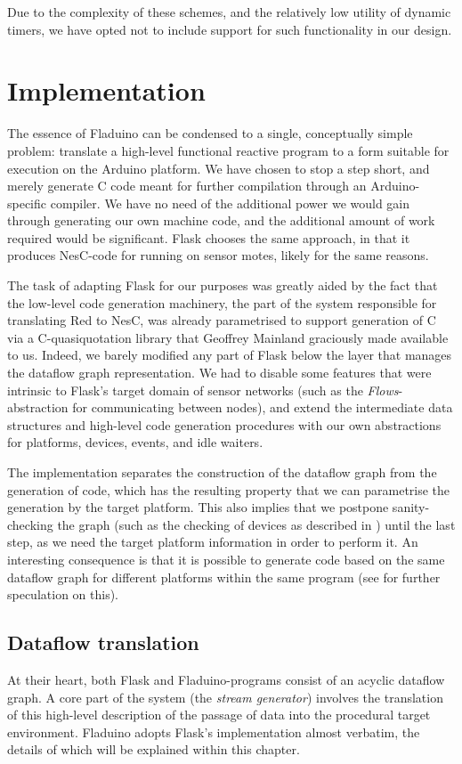 \documentclass[a4paper, oneside, final]{memoir}
\let\Fref\undefined
\begin{document}
Due to the complexity of these schemes, and the relatively low utility
of dynamic timers, we have opted not to include support for such
functionality in our design.

\chapter{Implementation}
\label{chap:implementation}

The essence of Fladuino can be condensed to a single, conceptually
simple problem: translate a high-level functional reactive program to
a form suitable for execution on the Arduino platform.  We have chosen
to stop a step short, and merely generate C code meant for further
compilation through an Arduino-specific compiler.  We have no need of
the additional power we would gain through generating our own machine
code, and the additional amount of work required would be significant.
Flask chooses the same approach, in that it produces NesC-code for
running on sensor motes, likely for the same reasons.

The task of adapting Flask for our purposes was greatly aided by the
fact that the low-level code generation machinery, the part of the
system responsible for translating Red to NesC, was already
parametrised to support generation of C via a C-quasiquotation library
that Geoffrey Mainland graciously made available to us.  Indeed, we
barely modified any part of Flask below the layer that manages the
dataflow graph representation.  We had to disable some features that
were intrinsic to Flask's target domain of sensor networks (such as
the \textit{Flows}-abstraction for communicating between nodes), and
extend the intermediate data structures and high-level code generation
procedures with our own abstractions for platforms, devices, events,
and idle waiters.

The implementation separates the construction of the dataflow graph
from the generation of code, which has the resulting property that we
can parametrise the generation by the target platform.  This also
implies that we postpone sanity-checking the graph (such as the
checking of devices as described in \Fref{sec:devices}) until the last
step, as we need the target platform information in order to perform
it.  An interesting consequence is that it is possible to generate
code based on the same dataflow graph for different platforms within
the same program (see \Fref{chap:futurework} for further speculation
on this).

\section{Dataflow translation}
\label{sec:dataflowtranslation}
At their heart, both Flask and Fladuino-programs consist of an
acyclic dataflow graph.  A core part of the system (the \textit{stream
  generator}) involves the translation of this high-level description
of the passage of data into the procedural target environment.
Fladuino adopts Flask's implementation almost verbatim, the details of
which will be explained within this chapter.
\end{document}
